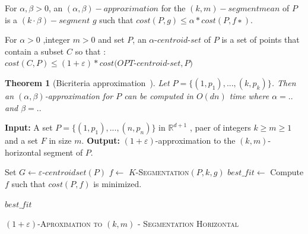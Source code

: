 \documentclass{vldb}
\begin{document}
\begin{definition}
For $ \alpha, \beta > 0$, an $(\alpha, \beta)-approximation$ for the $(k,m)-segment mean$
 of $P$ is a $(k · β)-segment$ $ g$ such that $cost(P, g) \leq \alpha \ast cost(P, f ∗).$

\end{definition}
\begin{definition}
For $ \alpha > 0$ ,integer $m>0$ and set $P$, an $\alpha$-$centroid$-$set$ of $P$ is a set of points that contain a subset $C$ so that : \\ $cost(C,P)\leq (1+\varepsilon)*cost(OPT$-$centroid$-$set,P)$ 

\end{definition}
\newtheorem{theorem}{Theorem}
\begin{theorem}[Bicriteria approximation~\cite{FL11}]
Let $P=\lbrace(1, p_1),...,(k, p_k)\rbrace$. Then an $(\alpha,\beta)$-approximation for $P$ can be computed in $O(dn)$ time where $\alpha=..$ and $\beta=..$

\end{theorem}
\begin{algorithm}
\begin{algorithmic}
\STATE \textbf{Input:} A set $P = \lbrace(1,p_1),...,(n,p_n)\rbrace$ in $ \mathbb{R}^{d+1}$
, paer of integers $k\geq m\geq1$
and a set $F$ in size $m$.
\STATE \textbf{Output:}  $(1+\varepsilon)$-approximation to the $(k,m)$-horizontal segment of $P$.

Set $G\gets \varepsilon$-$centroidset(P)$
\STATE 
$f \gets $ \textsc{$K$-Segmentation$(P,k,g)$}
\STATE $best\_fit \gets $ Compute $f$ such that $cost(P,f)$ is minimized.

\ENDFOR

\RETURN $best\_fit$



\caption{\textsc{$(1+\varepsilon)$-Aproximation to $(k,m)$ - Segmentation Horizontal}}

\end{algorithmic}
\end{algorithm}
\end{document}
